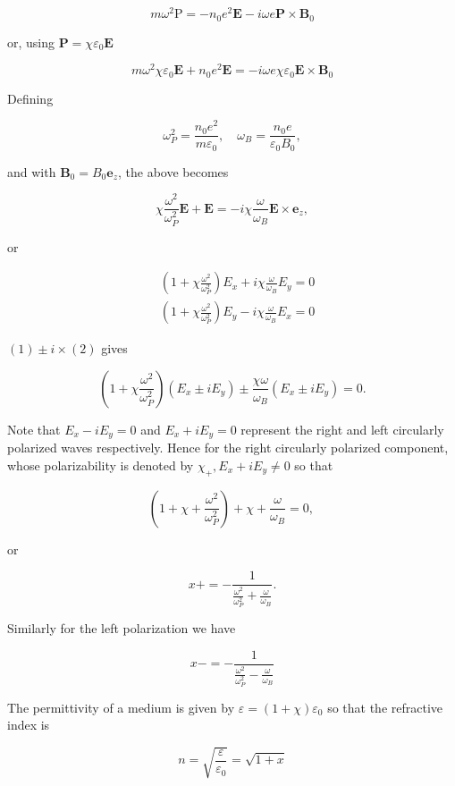 \documentclass[10pt]{article}
\begin{document}
$$
m \omega^{2} \mathrm{P}=-n_{0} e^{2} \mathbf{E}-i \omega e \mathbf{P} \times \mathbf{B}_{0}
$$

or, using $\mathbf{P}=\chi \varepsilon_{0} \mathbf{E}$

$$
m \omega^{2} \chi \varepsilon_{0} \mathbf{E}+n_{0} e^{2} \mathbf{E}=-i \omega e \chi \varepsilon_{0} \mathbf{E} \times \mathbf{B}_{0}
$$

Defining

$$
\omega_{P}^{2}=\frac{n_{0} e^{2}}{m \varepsilon_{0}}, \quad \omega_{B}=\frac{n_{0} e}{\varepsilon_{0} B_{0}},
$$

and with $\mathbf{B}_{0}=B_{0} \mathbf{e}_{z}$, the above becomes

$$
\chi \frac{\omega^{2}}{\omega_{P}^{2}} \mathbf{E}+\mathbf{E}=-i \chi \frac{\omega}{\omega_{B}} \mathbf{E} \times \mathbf{e}_{z},
$$

or

$$
\begin{aligned}
&\left(1+\chi \frac{\omega^{2}}{\omega_{P}^{2}}\right) E_{x}+i \chi \frac{\omega}{\omega_{B}} E_{y}=0 \\
&\left(1+\chi \frac{\omega^{2}}{\omega_{P}^{2}}\right) E_{y}-i \chi \frac{\omega}{\omega_{B}} E_{x}=0
\end{aligned}
$$

$(1) \pm i \times(2)$ gives

$$
\left(1+\chi \frac{\omega^{2}}{\omega_{P}^{2}}\right)\left(E_{x} \pm i E_{y}\right) \pm \frac{\chi \omega}{\omega_{B}}\left(E_{x} \pm i E_{y}\right)=0 .
$$

Note that $E_{x}-i E_{y}=0$ and $E_{x}+i E_{y}=0$ represent the right and left circularly polarized waves respectively. Hence for the right circularly polarized component, whose polarizability is denoted by $\chi_{+}, E_{x}+i E_{y} \neq 0$ so that

$$
\left(1+\chi+\frac{\omega^{2}}{\omega_{P}^{2}}\right)+\chi+\frac{\omega}{\omega_{B}}=0 \text {, }
$$

or

$$
x+=-\frac{1}{\frac{\omega^{2}}{\omega_{P}^{2}}+\frac{\omega}{\omega_{B}}} .
$$

Similarly for the left polarization we have

$$
x-=-\frac{1}{\frac{\omega^{2}}{\omega_{P}^{2}}-\frac{\omega}{\omega_{B}}}
$$

The permittivity of a medium is given by $\varepsilon=(1+\chi) \varepsilon_{0}$ so that the refractive index is

$$
n=\sqrt{\frac{\varepsilon}{\varepsilon_{0}}}=\sqrt{1+x}
$$
\end{document}

